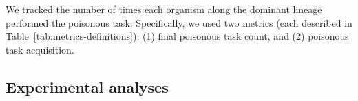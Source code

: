 We tracked the number of times each organism along the dominant lineage performed the poisonous task.
Specifically, we used two metrics (each described in Table~\ref{tab:metrics-definitions}):
(1) final poisonous task count,
and (2) poisonous task acquisition.




\vspace{5mm}
\subsection{Experimental analyses}




